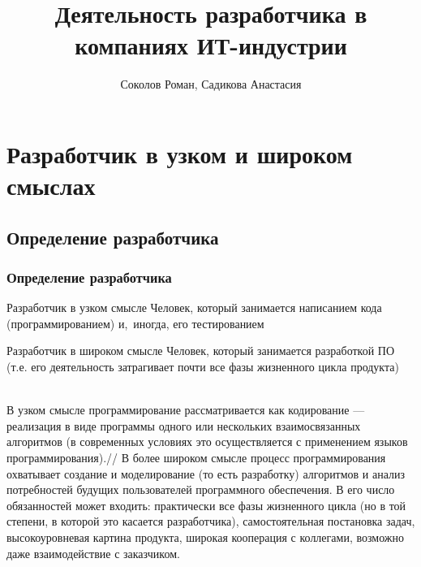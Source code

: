 \documentclass{../industrial-development}
\title{Деятельность разработчика в компаниях ИТ-индустрии}
\author{Соколов Роман, Садикова Анастасия}
\date{}
\begin{document}
\begin{frame}
  \titlepage
\end{frame}


\section{Разработчик в узком и широком смыслах}
\subsection{Определение разработчика}
\begin{frame} \frametitle{Определение разработчика}
	\begin{minipage}{0.47\textwidth}
		\begin{block}{Разработчик в узком смысле}
			Человек, который занимается написанием кода (программированием) и,~иногда, его тестированием
		\end{block}
	\end{minipage}
	\hfill
	\begin{minipage}{0.5\textwidth}
		\begin{block}{Разработчик в широком смысле}
			Человек, который занимается разработкой ПО (т.е. его деятельность затрагивает почти все фазы жизненного цикла продукта)
		\end{block}
	\end{minipage}
	
\end{frame}
\lecturenotes
\\В узком смысле программирование рассматривается как кодирование --- реализация в виде программы одного или нескольких взаимосвязанных алгоритмов (в современных условиях это осуществляется с применением языков программирования).//
В более широком смысле процесс программирования охватывает создание и моделирование (то есть разработку) алгоритмов и анализ потребностей будущих пользователей программного обеспечения. В его число обязанностей может входить: практически все фазы жизненного цикла (но в той степени, в которой это касается разработчика), самостоятельная постановка задач, высокоуровневая картина продукта, широкая кооперация с коллегами, возможно даже взаимодействие с заказчиком.
\end{document}
